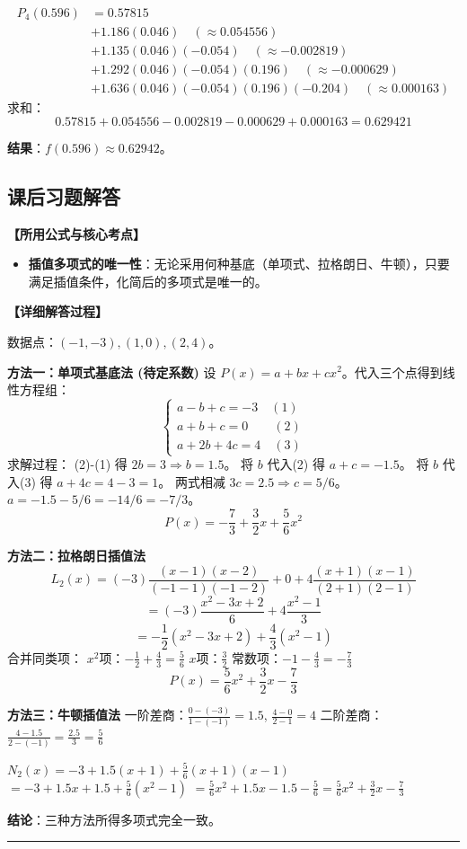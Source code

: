 \documentclass[a4paper,12pt]{ctexart}
\newcommand{\solitem}[3]{
    \vspace{1.5em}
    \begin{tcolorbox}[colback=gray!5!white, colframe=gray!50!black, title=\textbf{题目 #1}]
    \end{tcolorbox}
    
    \noindent\textbf{【所用公式与核心考点】}
    \begin{itemize}[leftmargin=2em, label=$\diamond$]
        #2
    \end{itemize}
    
    \noindent\textbf{【详细解答过程】}
    \par
    #3
    \par
    \vspace{1em}
    \hrule
}
\begin{document}
{    \begin{align*}
    P_4(0.596) &= 0.57815 \\
               &+ 1.186(0.046) \quad (\approx 0.054556) \\
               &+ 1.135(0.046)(-0.054) \quad (\approx -0.002819) \\
               &+ 1.292(0.046)(-0.054)(0.196) \quad (\approx -0.000629) \\
               &+ 1.636(0.046)(-0.054)(0.196)(-0.204) \quad (\approx 0.000163)
    \end{align*}
    求和：
    \[ 0.57815 + 0.054556 - 0.002819 - 0.000629 + 0.000163 = 0.629421 \]
  
    \textbf{结果}：$f(0.596) \approx 0.62942$。
}

\subsection*{课后习题解答}

\solitem{1}{
    \item \textbf{插值多项式的唯一性}：无论采用何种基底（单项式、拉格朗日、牛顿），只要满足插值条件，化简后的多项式是唯一的。
}{
    数据点：$(-1, -3), (1, 0), (2, 4)$。
  
    \textbf{方法一：单项式基底法 (待定系数)}
    设 $P(x) = a + bx + cx^2$。代入三个点得到线性方程组：
    \[ \begin{cases} a - b + c = -3 \quad (1) \\ a + b + c = 0 \quad \quad (2) \\ a + 2b + 4c = 4 \quad (3) \end{cases} \]
    求解过程：
    (2)-(1) 得 $2b = 3 \Rightarrow b = 1.5$。
    将 $b$ 代入(2) 得 $a+c = -1.5$。
    将 $b$ 代入(3) 得 $a+4c = 4 - 3 = 1$。
    两式相减 $3c = 2.5 \Rightarrow c = 5/6$。
    $a = -1.5 - 5/6 = -14/6 = -7/3$。
    \[ P(x) = -\frac{7}{3} + \frac{3}{2}x + \frac{5}{6}x^2 \]
  
    \textbf{方法二：拉格朗日插值法}
    \[ L_2(x) = (-3)\frac{(x-1)(x-2)}{(-1-1)(-1-2)} + 0 + 4\frac{(x+1)(x-1)}{(2+1)(2-1)} \]
    \[ = (-3)\frac{x^2-3x+2}{6} + 4\frac{x^2-1}{3} \]
    \[ = -\frac{1}{2}(x^2-3x+2) + \frac{4}{3}(x^2-1) \]
    合并同类项：
    $x^2$项：$-\frac{1}{2} + \frac{4}{3} = \frac{5}{6}$
    $x$项：$\frac{3}{2}$
    常数项：$-1 - \frac{4}{3} = -\frac{7}{3}$
    \[ P(x) = \frac{5}{6}x^2 + \frac{3}{2}x - \frac{7}{3} \]
  
    \textbf{方法三：牛顿插值法}
    一阶差商：$\frac{0-(-3)}{1-(-1)} = 1.5$, $\frac{4-0}{2-1} = 4$
    二阶差商：$\frac{4-1.5}{2-(-1)} = \frac{2.5}{3} = \frac{5}{6}$
  
    $N_2(x) = -3 + 1.5(x+1) + \frac{5}{6}(x+1)(x-1)$
    $= -3 + 1.5x + 1.5 + \frac{5}{6}(x^2-1)$
    $= \frac{5}{6}x^2 + 1.5x - 1.5 - \frac{5}{6} = \frac{5}{6}x^2 + \frac{3}{2}x - \frac{7}{3}$
  
    \textbf{结论}：三种方法所得多项式完全一致。
}
\end{document}
